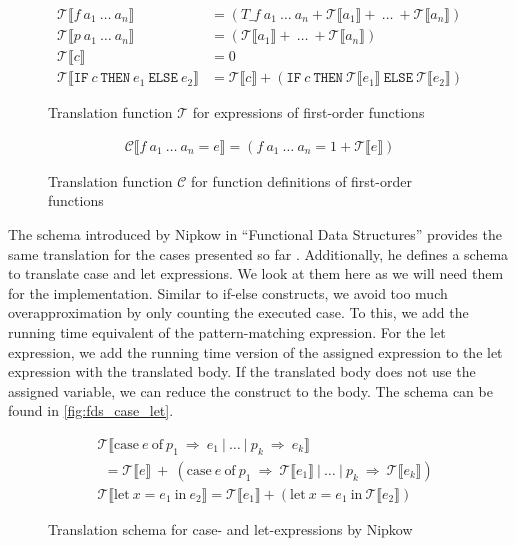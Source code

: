 \begin{figure}
  \begin{align*}
    \mathcal{T}\llbracket f\ a_{1}\ \dots\ a_{n}\rrbracket &= (T\_f\ a_{1}\ \dots\ a_{n} + \mathcal{T}\llbracket a_{1}\rrbracket +\ \dots\ + \mathcal{T}\llbracket a_{n}\rrbracket)\\
    \mathcal{T}\llbracket p\ a_{1}\ \dots\ a_{n}\rrbracket &= (\mathcal{T}\llbracket a_{1}\rrbracket +\ \dots\ + \mathcal{T}\llbracket a_{n}\rrbracket)\\
    \mathcal{T}\llbracket c\rrbracket &= 0\\
    \mathcal{T}\llbracket \texttt{IF}\ c\ \texttt{THEN}\ e_{1}\ \texttt{ELSE}\ e_{2}\rrbracket &= \mathcal{T}\llbracket c\rrbracket + (\texttt{IF}\ c\ \texttt{THEN}\ \mathcal{T}\llbracket e_{1}\rrbracket\ \texttt{ELSE}\ \mathcal{T}\llbracket e_{2}\rrbracket)
  \end{align*}
  \caption{Translation function $\mathcal{T}$ for expressions of first-order functions}
  \label{fig:first_order_T}
\end{figure}

\begin{figure}
\begin{align*}
    \mathcal{C}\llbracket f\ a_{1}\ \dots\ a_{n} = e\rrbracket = (f\ a_{1}\ \dots\ a_{n} = 1 + \mathcal{T}\llbracket e \rrbracket)
\end{align*}
\caption{Translation function $\mathcal{C}$ for function definitions of first-order functions}
\label{fig:first_order_C}
\end{figure}

The schema introduced by Nipkow in ``Functional Data Structures'' provides the same translation for the cases presented so far \parencite{fds}.
Additionally, he defines a schema to translate case and let expressions.
We look at them here as we will need them for the implementation.
Similar to if-else constructs, we avoid too much overapproximation by only counting the executed case.
To this, we add the running time equivalent of the pattern-matching expression.
For the let expression, we add the running time version of the assigned expression to the let expression with the translated body.
If the translated body does not use the assigned variable, we can reduce the construct to the body.
The schema can be found in \autoref{fig:fds_case_let}.
\begin{figure}
  \begin{align*}
    &\mathcal{T}\llbracket \text{case}\ e\ \text{of}\ p_{1}\ \Rightarrow\ e_{1}\ |\ \dots\ |\ p_{k}\ \Rightarrow\ e_{k}\rrbracket\\
    &\ \ = \mathcal{T}\llbracket e \rrbracket\ +\ (\text{case}\ e\ \text{of}\ p_{1}\ \Rightarrow\ \mathcal{T}\llbracket e_{1}\rrbracket\ |\ \dots\ |\ p_{k}\ \Rightarrow\ \mathcal{T}\llbracket e_{k}\rrbracket)\\
    &\mathcal{T}\llbracket\text{let}\ x = e_{1}\ \text{in}\ e_{2}\rrbracket = \mathcal{T}\llbracket e_{1}\rrbracket + (\text{let}\ x = e_{1}\ \text{in}\ \mathcal{T}\llbracket e_{2}\rrbracket)
  \end{align*}
  \caption{Translation schema for case- and let-expressions by Nipkow}
  \label{fig:fds_case_let}
\end{figure}
